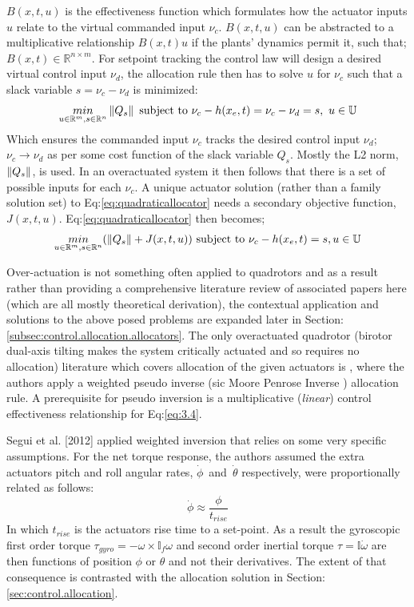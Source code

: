 $B(x,t,u)$ is the effectiveness function which formulates how the actuator inputs $u$ relate to the virtual commanded input $\nu_c$. $B(x,t,u)$ can be abstracted to a multiplicative relationship $B(x,t)u$ if the plants' dynamics permit it, such that; $B(x,t)\in\mathbb{R}^{n\times m}$. For setpoint tracking the control law will design a desired virtual control input $\nu_d$, the allocation rule then has to solve $u$ for $\nu_c$ such that a slack variable $s=\nu_c-\nu_d$ is minimized:
\begin{equation}\label{eq:quadraticallocator}
\underset{u \in \mathbb{R}^m ,s \in \mathbb{R}^n}{min}\left\lVert Q_s\right\rVert ~\text{subject to} ~\nu_c - h(x_e,t)=\nu_c-\nu_d=s,~u \in \mathbb{U}
\end{equation}
Which ensures the commanded input $\nu_c$ tracks the desired control input $\nu_d$; $\nu_c\rightarrow\nu_d$ as per some cost function of the slack variable $Q_s$. Mostly the L2 norm, $\left\lVert Q_s\right\rVert$, is used. In an overactuated system it then follows that there is a set of possible inputs for each $\nu_c$. A unique actuator solution (rather than a family solution set) to Eq:\ref{eq:quadraticallocator} needs a secondary objective function, $J(x,t,u)$. Eq:\ref{eq:quadraticallocator} then becomes;
\begin{equation} \label{eq:quadraticallocatorcost}
\underset{u \in \mathbb{R}^m ,s \in \mathbb{R}^n}{min}(\left\lVert Q_s\right\rVert+J(x,t,u)) ~\text{subject to} ~\nu_c - h(x_e,t)=s, u \in \mathbb{U}
\end{equation}
\par
Over-actuation is not something often applied to quadrotors and as a result rather than providing a comprehensive literature review of associated papers here (which are all mostly theoretical derivation), the contextual application and solutions to the above posed problems are expanded later in Section: \ref{subsec:control.allocation.allocators}. The only overactuated quadrotor (birotor dual-axis tilting makes the system critically actuated and so requires no allocation) literature which covers allocation of the given actuators is \cite{tiltgasco,tiltrihani}, where the authors apply a weighted pseudo inverse (sic Moore Penrose Inverse \cite{moorepenrose}) allocation rule. A prerequisite for pseudo inversion is a multiplicative (\emph{linear}) control effectiveness relationship for Eq:\ref{eq:3.4}. 
\par
Segui et al. [2012] applied weighted inversion that relies on some very specific assumptions. For the net torque response, the authors assumed the extra actuators pitch and roll angular rates, $\dot{\phi}$~and~$\dot{\theta}$ respectively, were proportionally related as follows:
\begin{equation}
\dot{\phi}\approx\frac{\phi}{t_{rise}}
\end{equation}
In which $t_{rise}$ is the actuators rise time to a set-point. As a result the gyroscopic first order torque $\tau_{gyro}=-\omega\times\mathbb{I}_f\omega$ and second order inertial torque $\tau=\mathbb{I}\dot{\omega}$ are then functions of position $\phi$ or $\theta$ and not their derivatives. The extent of that consequence is contrasted with the allocation solution in Section:\ref{sec:control.allocation}.
